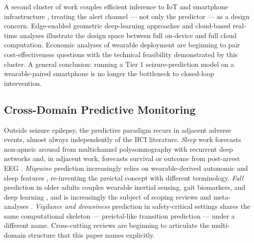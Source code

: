 A second cluster of work couples efficient inference to IoT and smartphone infrastructure \cite{Paneru2026,KumarEtAl2026,ThahniyathEtAl2024,AbbasiEtAl2025}, treating the alert channel --- not only the predictor --- as a design concern. Edge-enabled geometric deep-learning approaches \cite{AbbasiEtAl2025} and cloud-based real-time analyses \cite{ThahniyathEtAl2024} illustrate the design space between full on-device and full cloud computation. Economic analyses of wearable deployment \cite{VelasquezEtAl2024} are beginning to pair cost-effectiveness questions with the technical feasibility demonstrated by this cluster. A general conclusion: running a Tier 1 seizure-prediction model on a wearable-paired smartphone is no longer the bottleneck to closed-loop intervention.

\subsection{Cross-Domain Predictive Monitoring}
\label{sec:rw-crossdomain}

Outside seizure epilepsy, the predictive paradigm recurs in adjacent adverse events, almost always independently of the BCI literature. \emph{Sleep} work forecasts non-apneic arousal from multichannel polysomnography with recurrent deep networks \cite{JamaraniEtAl2026} and, in adjacent work, forecasts survival or outcome from post-arrest EEG \cite{PelentritouEtAl2025,NesaragiEtAl2025,StaffordEtAl2026,ZhouEtAl2026b}. \emph{Migraine} prediction increasingly relies on wearable-derived autonomic and sleep features \cite{TomalinEtAl2025,KapustynskaEtAl2024,KapustynskaEtAl2025,JankevičiūtėEtAl2026}, re-inventing the preictal concept with different terminology. \emph{Fall} prediction in older adults couples wearable inertial sensing, gait biomarkers, and deep learning \cite{MaioraEtAl2024,ChanEtAl2023,Al-HammouriEtAl2025,CavanaghEtAl2024,GuanEtAl2025,LinEtAl2025,ZhangEtAl2024,LiaoEtAl2025b,ZuoEtAl2024,CesariEtAl2023}, and is increasingly the subject of scoping reviews and meta-analyses \cite{HrubýEtAl2026,MouEtAl2026,MehrlatifanMolla2024}. \emph{Vigilance and drowsiness} prediction in safety-critical settings \cite{TheivadasPonnan2025,SchwarzEtAl2023,Al-QuraishiEtAl2024,ZhangEtAl2025} shares the same computational skeleton --- preictal-like transition prediction --- under a different name. Cross-cutting reviews \cite{WesalEtAl2026,QamarEtAl2025,GongEtAl2025,Kumar2025} are beginning to articulate the multi-domain structure that this paper names explicitly.

